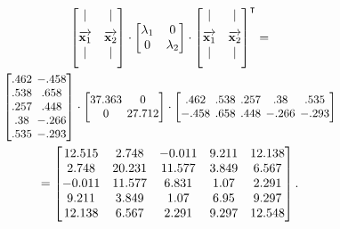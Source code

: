\begin{alttitles}
\vspace{-.15in}
\begin{gather*}
\begin{bmatrix}
| & | \\[6pt]
\overrightarrow{\textbf{x}_{1}} &
\overrightarrow{\textbf{x}_{2}} \\
| & | \\[6pt]
\end{bmatrix} \cdot
\begin{bmatrix}
\lambda_1 & 0 \\
0 & \lambda_2 \\
\end{bmatrix} \cdot
\begin{bmatrix}
| & | \\[6pt]
\overrightarrow{\textbf{x}_{1}} &
\overrightarrow{\textbf{x}_{2}} \\
| & | \\[6pt]
\end{bmatrix}^\intercal = \\
\small
\begingroup
\setlength\arraycolsep{2pt}
\begin{bmatrix}
.462 & -.458 \\
.538 & .658 \\
.257 & .448 \\
.38 & -.266 \\
.535 & -.293 \\
\end{bmatrix} \cdot
\begin{bmatrix}
37.363 & 0 \\
0 & 27.712 \\
\end{bmatrix} \cdot
\begin{bmatrix}
.462 & .538 & .257 & .38 & .535 \\
-.458 & .658 & .448 & -.266 & -.293 \\
\end{bmatrix}\endgroup\\
=
\begin{bmatrix}
 12.515 & 2.748 & -0.011 & 9.211 & 12.138 \\
 2.748 & 20.231 & 11.577 & 3.849 & 6.567 \\
 -0.011 & 11.577 & 6.831 & 1.07 & 2.291 \\
 9.211 & 3.849 & 1.07 & 6.95 & 9.297 \\
 12.138 & 6.567 & 2.291 & 9.297 & 12.548 \\
\end{bmatrix}.
\end{gather*}
\vspace{-.05in}


\end{alttitles}
